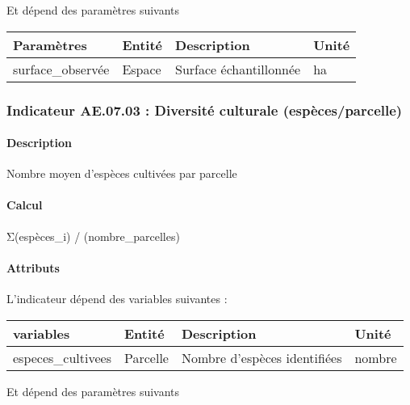 \documentclass[
]{article}
\newenvironment{Shaded}{\begin{snugshade}}{\end{snugshade}}
\newcommand{\NormalTok}[1]{#1}
\begin{document}
Et dépend des paramètres suivants

\begin{longtable}[]{@{}llll@{}}
\toprule\noalign{}
\textbf{Paramètres} & \textbf{Entité} & \textbf{Description} &
\textbf{Unité} \\
\midrule\noalign{}
\endhead
\bottomrule\noalign{}
\endlastfoot
surface\_observée & Espace & Surface échantillonnée & ha \\
\end{longtable}

\subsubsection{Indicateur AE.07.03 : Diversité culturale
(espèces/parcelle)}\label{indicateur-ae.07.03-diversituxe9-culturale-espuxe8cesparcelle}

\paragraph{Description}\label{description-16}

Nombre moyen d'espèces cultivées par parcelle

\paragraph{Calcul}\label{calcul-16}

\begin{Shaded}
\begin{Highlighting}[]
\NormalTok{Σ(espèces\_i) / (nombre\_parcelles)}
\end{Highlighting}
\end{Shaded}

\paragraph{Attributs}\label{attributs-34}

L'indicateur dépend des variables suivantes :

\begin{longtable}[]{@{}llll@{}}
\toprule\noalign{}
\textbf{variables} & \textbf{Entité} & \textbf{Description} &
\textbf{Unité} \\
\midrule\noalign{}
\endhead
\bottomrule\noalign{}
\endlastfoot
especes\_cultivees & Parcelle & Nombre d'espèces identifiées & nombre \\
\end{longtable}

Et dépend des paramètres suivants
\end{document}
